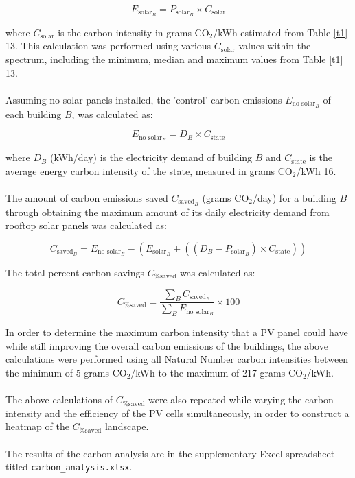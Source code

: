 \begin{equation}
E_{{\mbox{solar}}_{B}} = P_{{\mbox{solar}}_{B}} \times C_{\mbox{solar}}
\end{equation}

\noindent where $C_{\mbox{solar}}$ is the carbon intensity in grams CO$_{2}$/kWh estimated from Table \ref{t1} \cite{debbie}{13}. This calculation was performed using various $C_{\mbox{solar}}$ values within the spectrum, including the minimum, median and maximum values from Table \ref{t1} \cite{debbie}{13}.
\\\\
\noindent Assuming no solar panels installed, the 'control' carbon emissions $E_{{\mbox{no solar}}_{B}}$ of each building $B$, was calculated as:

\begin{equation}
E_{{\mbox{no solar}}_{B}} = D_{B} \times C_{\mbox{state}}
\end{equation}

\noindent where $D_{B}$ (kWh/day) is the electricity demand of building $B$ and $C_{\mbox{state}}$ is the average energy carbon intensity of the state, measured in grams CO$_{2}$/kWh \cite{debbie}{16}.
\\\\
\noindent The amount of carbon emissions saved $C_{{\mbox{saved}}_{B}}$ (grams CO$_{2}$/day) for a building $B$ through obtaining the maximum amount of its daily electricity demand from rooftop solar panels was calculated as:

\begin{equation}
C_{{\mbox{saved}}_{B}} = E_{{\mbox{no solar}}_{B}} - \left(E_{{\mbox{solar}}_{B}} + \left( \left( D_{B} - P_{{\mbox{solar}}_{B}}\right) \times C_{\mbox{state}}\right) \right)
\end{equation}

\noindent The total percent carbon savings $C_{\mbox{\% saved}}$  was calculated as:

\begin{equation}
C_{\mbox{\% saved}} = \frac{\sum_{B}C_{{\mbox{saved}}_{B}}}{\sum_{B}E_{{\mbox{no solar}}_{B}}} \times 100
\end{equation}

\noindent In order to determine the maximum carbon intensity that a PV panel could have while still
improving the overall carbon emissions of the buildings, the above calculations were performed using all Natural Number carbon intensities between the minimum of 5 grams CO$_{2}$/kWh to the maximum of 217 grams CO$_{2}$/kWh.
\\\\
\noindent The above calculations of $C_{\mbox{\% saved}}$ were also repeated while varying the carbon intensity and the efficiency of the PV cells simultaneously, in order to construct a heatmap of the $C_{\mbox{\% saved}}$ landscape.
\\\\
\noindent 
The results of the carbon analysis are in the supplementary Excel spreadsheet titled \texttt{carbon\_analysis.xlsx}.

